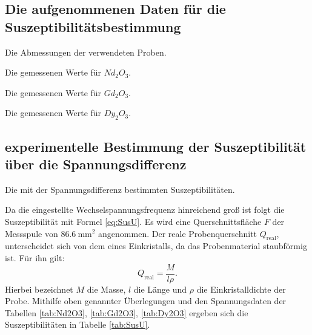 \subsection{Die aufgenommenen Daten für die Suszeptibilitätsbestimmung}

\begin{table}
 \centering
 \caption{Die Abmessungen der verwendeten Proben.}
 
 \label{tab:basis}
\end{table}


\begin{table}
 \centering
 \caption{Die gemessenen Werte für $Nd_2O_3$.}
 
 \label{tab:Nd2O3}
\end{table}

\begin{table}
 \centering
 \caption{Die gemessenen Werte für $Gd_2O_3$.}
 
 \label{tab:Gd2O3}
\end{table}


\begin{table}
 \centering
 \caption{Die gemessenen Werte für $Dy_2O_3$.}
 
 \label{tab:Dy2O3}
\end{table}

\subsection{experimentelle Bestimmung der Suszeptibilität über die Spannungsdifferenz}

\begin{table}
 \centering
 \caption{Die mit der Spannungsdifferenz bestimmten Suszeptibilitäten.}
 
 \label{tab:SusU}
\end{table}

Da die eingestellte Wechselspannungsfrequenz hinreichend groß ist folgt die
Suszeptibilität mit Formel \ref{eq:SusU}. Es wird eine Querschnittsfläche $F$
der Messspule von $\SI{86.6}{\milli\meter\squared}$ angenommen. Der reale Probenquerschnitt $Q_\text{real}$,
unterscheidet sich von dem eines Einkristalls, da das Probenmaterial staubförmig ist. Für ihn gilt:
\begin{equation}
  Q_\text{real} = \frac{M}{l \rho}\text{.}
\end{equation}
Hierbei bezeichnet $M$ die Masse, $l$ die Länge und $\rho$ die Einkristalldichte der Probe.
Mithilfe oben genannter Überlegungen und den Spannungsdaten der Tabellen \ref{tab:Nd2O3}, \ref{tab:Gd2O3}, \ref{tab:Dy2O3}
ergeben sich die Suszeptibilitäten in Tabelle \ref{tab:SusU}.



